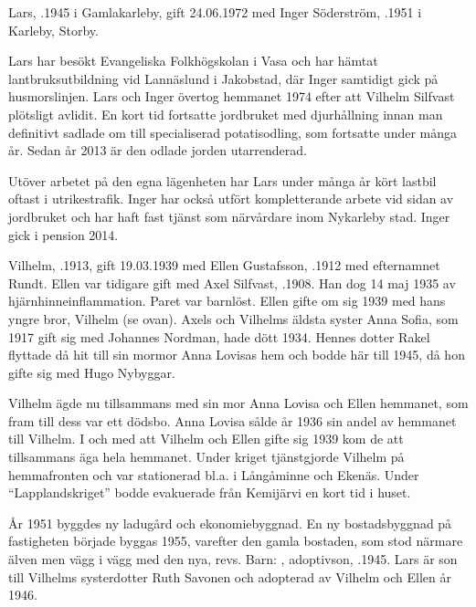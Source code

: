 
Lars, .1945 i Gamlakarleby, gift 24.06.1972 med Inger Söderström, .1951 i Karleby, Storby.
\begin{jhchildren}
  \item {}
  \item {}
  \item {}
\end{jhchildren}

Lars har besökt Evangeliska Folkhögskolan i Vasa och har hämtat lantbruksutbildning vid Lannäslund i Jakobstad, där Inger samtidigt gick på husmorslinjen. Lars och Inger övertog hemmanet 1974 efter att Vilhelm Silfvast plötsligt avlidit. En kort tid fortsatte jordbruket med djurhållning innan man definitivt sadlade om till specialiserad potatisodling, som  fortsatte under många år. Sedan år 2013  är den odlade jorden utarrenderad.

Utöver arbetet på den egna lägenheten har Lars under många år kört lastbil oftast i utrikestrafik. Inger har också utfört kompletterande arbete vid sidan av jordbruket och har haft fast tjänst som närvårdare inom Nykarleby stad. Inger gick i pension 2014.


Vilhelm, .1913, gift 19.03.1939 med Ellen Gustafsson, .1912 med efternamnet Rundt. Ellen var tidigare gift med Axel Silfvast, .1908. Han dog 14 maj 1935 av hjärnhinneinflammation. Paret var barnlöst. Ellen gifte om sig 1939 med hans yngre bror, Vilhelm (se ovan). Axels och Vilhelms äldsta syster Anna Sofia, som 1917 gift sig med Johannes Nordman, hade dött 1934. Hennes dotter Rakel flyttade då hit till sin mormor Anna Lovisas hem och bodde här till 1945, då hon gifte sig med Hugo Nybyggar.

Vilhelm ägde nu tillsammans med sin mor Anna Lovisa och Ellen hemmanet, som fram till dess var ett dödsbo. Anna Lovisa sålde år 1936 sin andel av hemmanet till Vilhelm. I och med att Vilhelm och Ellen gifte sig 1939 kom de att tillsammans äga hela hemmanet. Under kriget tjänstgjorde Vilhelm på hemmafronten och var stationerad bl.a. i Långåminne och Ekenäs. Under ``Lapplandskriget'' bodde evakuerade från Kemijärvi en kort tid  i huset.

År 1951 byggdes ny ladugård och ekonomiebyggnad. En ny bostadsbyggnad på fastigheten började byggas 1955, varefter den gamla bostaden, som stod närmare älven men vägg i vägg med den nya, revs.
Barn:  , adoptivson, .1945. Lars är son till Vilhelms systerdotter Ruth Savonen och adopterad av Vilhelm och Ellen år 1946.

